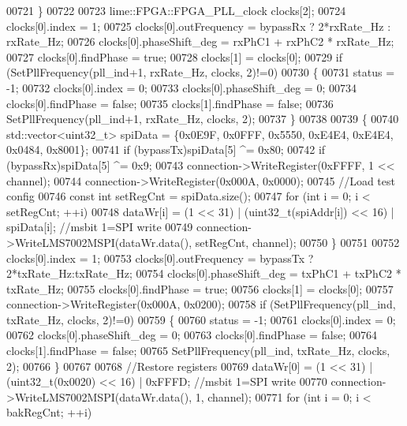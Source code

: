 \begin{DoxyCode}
{{{{{00721     \}
00722 
00723     lime::FPGA::FPGA_PLL_clock clocks[2];
00724     clocks[0].index = 1;
00725     clocks[0].outFrequency = bypassRx ? 2*rxRate\_Hz : rxRate\_Hz;
00726     clocks[0].phaseShift_deg = rxPhC1 + rxPhC2 * rxRate\_Hz;
00727     clocks[0].findPhase = \textcolor{keyword}{true};
00728     clocks[1] = clocks[0];
00729     \textcolor{keywordflow}{if} (SetPllFrequency(pll\_ind+1, rxRate\_Hz, clocks, 2)!=0)
00730     \{
00731         status = -1;
00732         clocks[0].index = 0;
00733         clocks[0].phaseShift_deg = 0;
00734         clocks[0].findPhase = \textcolor{keyword}{false};
00735         clocks[1].findPhase = \textcolor{keyword}{false};
00736         SetPllFrequency(pll\_ind+1, rxRate\_Hz, clocks, 2);
00737     \}
00738 
00739     \{
00740         std::vector<uint32\_t> spiData = \{0x0E9F, 0x0FFF, 0x5550, 0xE4E4, 0xE4E4, 0x0484, 0x8001\};
00741         \textcolor{keywordflow}{if} (bypassTx)spiData[5] ^= 0x80;
00742         \textcolor{keywordflow}{if} (bypassRx)spiData[5] ^= 0x9;
00743         connection->WriteRegister(0xFFFF, 1 << channel);
00744         connection->WriteRegister(0x000A, 0x0000);
00745         \textcolor{comment}{//Load test config}
00746         \textcolor{keyword}{const} \textcolor{keywordtype}{int} setRegCnt = spiData.size();
00747         \textcolor{keywordflow}{for} (\textcolor{keywordtype}{int} i = 0; i < setRegCnt; ++i)
00748             dataWr[i] = (1 << 31) | (uint32\_t(spiAddr[i]) << 16) | spiData[i]; \textcolor{comment}{//msbit 1=SPI write}
00749         connection->WriteLMS7002MSPI(dataWr.data(), setRegCnt, channel);
00750     \}
00751 
00752     clocks[0].index = 1;
00753     clocks[0].outFrequency = bypassTx ? 2*txRate\_Hz:txRate\_Hz;
00754     clocks[0].phaseShift_deg = txPhC1 + txPhC2 * txRate\_Hz;
00755     clocks[0].findPhase = \textcolor{keyword}{true};
00756     clocks[1] = clocks[0];
00757     connection->WriteRegister(0x000A, 0x0200);
00758     \textcolor{keywordflow}{if} (SetPllFrequency(pll\_ind, txRate\_Hz, clocks, 2)!=0)
00759     \{
00760         status = -1;
00761         clocks[0].index = 0;
00762         clocks[0].phaseShift_deg = 0;
00763         clocks[0].findPhase = \textcolor{keyword}{false};
00764         clocks[1].findPhase = \textcolor{keyword}{false};
00765         SetPllFrequency(pll\_ind, txRate\_Hz, clocks, 2);
00766     \}
00767 
00768     \textcolor{comment}{//Restore registers}
00769     dataWr[0] = (1 << 31) | (uint32\_t(0x0020) << 16) | 0xFFFD; \textcolor{comment}{//msbit 1=SPI write}
00770     connection->WriteLMS7002MSPI(dataWr.data(), 1, channel);
00771     \textcolor{keywordflow}{for} (\textcolor{keywordtype}{int} i = 0; i < bakRegCnt; ++i)
}}}}}
\end{DoxyCode}
